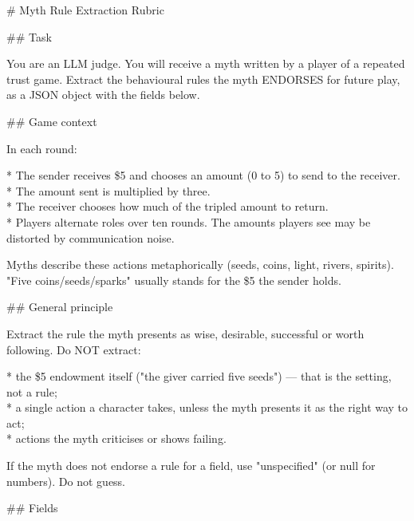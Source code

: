 \begin{promptbox}
\# Myth Rule Extraction Rubric

\#\# Task

You are an LLM judge. You will receive a myth written by a player of a repeated trust game. Extract the behavioural rules the myth ENDORSES for future play, as a JSON object with the fields below.

\#\# Game context

In each round:

* The sender receives \$5 and chooses an amount (0 to 5) to send to the receiver.\\
* The amount sent is multiplied by three.\\
* The receiver chooses how much of the tripled amount to return.\\
* Players alternate roles over ten rounds. The amounts players see may be distorted by communication noise.

Myths describe these actions metaphorically (seeds, coins, light, rivers, spirits). "Five coins/seeds/sparks" usually stands for the \$5 the sender holds.

\#\# General principle

Extract the rule the myth presents as wise, desirable, successful or worth following. Do NOT extract:

* the \$5 endowment itself ("the giver carried five seeds") — that is the setting, not a rule;\\
* a single action a character takes, unless the myth presents it as the right way to act;\\
* actions the myth criticises or shows failing.

If the myth does not endorse a rule for a field, use "unspecified" (or null for numbers). Do not guess.

\#\# Fields


\end{promptbox}
